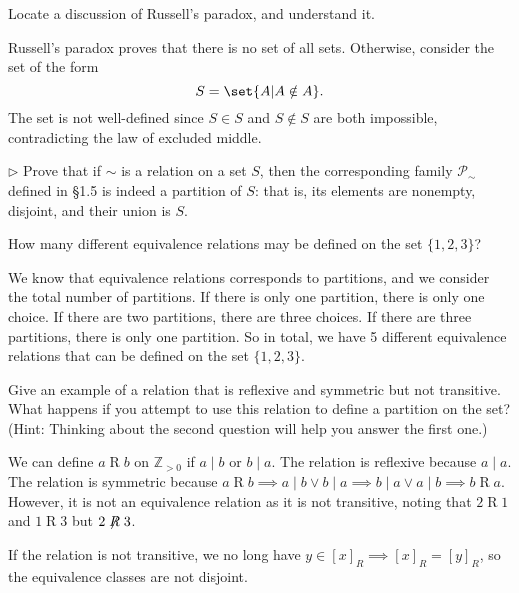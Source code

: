 \documentclass[parskip=full, draft=true]{scrartcl}
\begin{document}
\listoftodos
{}
\begin{prob}{1}
    Locate a discussion of Russell’s paradox, and understand it.
\end{prob}
\begin{sol}
    Russell's paradox proves that there is no set of all sets. Otherwise, consider the set of the form
    \[
        S = \set{A | A \notin A}.
    \]
    The set is not well-defined since \(S \in S\) and \(S \notin S\) are both impossible, contradicting the law of excluded middle.
\end{sol}
\begin{prob}{2}
    \(\triangleright\) Prove that if \(\sim\) is a relation on a set \(S\), then the corresponding family \(\mathscr{P}_{\sim}\) defined in \S 1.5 is indeed a partition of \(S\): that is, its elements are nonempty, disjoint, and their union is \(S\).
\end{prob}
\begin{sol}
\end{sol}
\begin{prob}{4}
    How many different equivalence relations may be defined on the set \(\{1, 2, 3\}\)?
\end{prob}
\begin{sol}
    We know that equivalence relations corresponds to partitions, and we consider the total number of partitions. If there is only one partition, there is only one choice. If there are two partitions, there are three choices. If there are three partitions, there is only one partition. So in total, we have 5 different equivalence relations that can be defined on the set \(\{1, 2, 3\}\).
\end{sol}
\begin{prob}{5}
    Give an example of a relation that is reflexive and symmetric but not transitive. What happens if you attempt to use this relation to define a partition on the set? (Hint: Thinking about the second question will help you answer the first one.)
\end{prob}
\begin{sol}
    We can define \(a \mathrel{R} b\) on \(\mathbb{Z}_{>0}\) if \(a \mid b\) or \(b \mid a\). The relation is reflexive because \(a \mid a\). The relation is symmetric because \(a\mathrel{R}b \implies a \mid b \lor b \mid a \implies b \mid a \lor a \mid b \implies b\mathrel{R}a\). However, it is not an equivalence relation as it is not transitive, noting that \(2\mathrel{R}1\) and \(1\mathrel{R}3\) but \(2 \not \mathrel{R} 3\).

    If the relation is not transitive, we no long have \(y \in [x]_R \implies [x]_R = [y]_R\), so the equivalence classes are not disjoint.
\end{sol}
\end{document}
